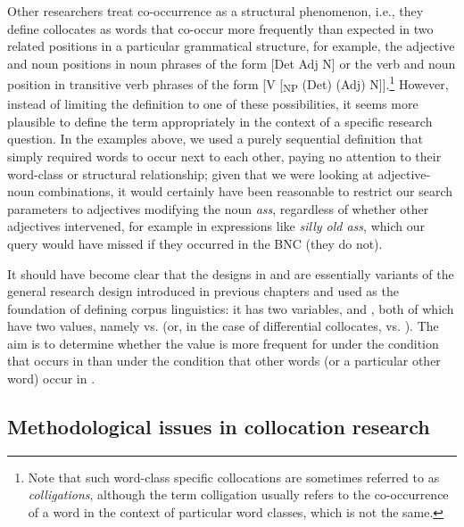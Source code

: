 Other researchers treat co\hyp{}occurrence as a structural phenomenon, i.e., they define collocates  as words that co\hyp{}occur more frequently than expected  in two related positions in a particular grammatical structure, for example, the adjective  and noun  positions in noun phrases of the form [Det Adj N] or the verb  and noun position in transitive  verb phrases of the form [V [\textsubscript{NP} (Det) (Adj) N]].\footnote{Note that such word\hyp{}class specific collocations  are sometimes referred to as \textit{colligations}, although the term colligation usually refers to the co\hyp{}occurrence of a word in the context of particular word classes, which is not the same.} However, instead of limiting the definition to one of these possibilities, it seems more plausible to define the term appropriately in the context of a specific research question. In the examples above, we used a purely sequential definition that simply required words to occur next to each other, paying no attention to their word\hyp{}class or structural relationship; given that we were looking at adjective\hyp{}noun  combinations, it would certainly have been reasonable to restrict our search parameters to adjectives  modifying the noun \textit{ass}, regardless of whether other adjectives  intervened, for example in expressions like \textit{silly old ass}, which our query  would have missed if they occurred in the BNC  (they do not).

It should have become clear that the designs  in  and  are essentially variants of the general research design introduced in previous chapters and used as the foundation of defining corpus linguistics: it has two variables,  and , both of which have two values, namely  vs.  (or, in the case of differential collocates,   vs. ). The aim is to determine whether the value  is more frequent for  under the condition that  occurs in  than under the condition that other words (or a particular other word) occur in .

\subsection{Methodological issues in collocation research}
\label{sec:methodologicalissuesincollocationresearch}

